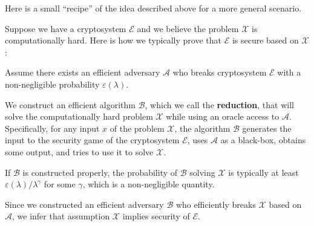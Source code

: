 \documentclass[../../book.tex]{subfiles}
\begin{document}
Here is a small ``recipe'' of the idea described above for a more general scenario.

\begin{proposition}
    Suppose we have a cryptosystem $\mathcal{E}$ and we believe the problem $\mathcal{X}$ is computationally hard.
    Here is how we typically prove that $\mathcal{E}$ is secure based on $\mathcal{X}$:
    \begin{algoen}
        \item Assume there exists an efficient adversary $\mathcal{A}$ who breaks cryptosystem $\mathcal{E}$ with a non-negligible probability $\varepsilon(\lambda)$.
        \item We construct an efficient algorithm $\mathcal{B}$, which we call the
        \textbf{reduction}, that will solve the computationally hard problem
        $\mathcal{X}$ while using an oracle access to $\mathcal{A}$. Specifically, for any
        input $x$ of the problem $\mathcal{X}$, the algorithm $\mathcal{B}$
        generates the input to the security game of the cryptosystem $\mathcal{E}$, uses $\mathcal{A}$ as a black-box, obtains some output, and tries to use it to solve $\mathcal{X}$.
        \item If $\mathcal{B}$ is constructed properly, the probability of $\mathcal{B}$ solving $\mathcal{X}$ is typically at least $\varepsilon(\lambda)/\lambda^{\gamma}$ for some $\gamma$, which is a non-negligible quantity.
        \item Since we constructed an efficient adversary $\mathcal{B}$ who efficiently breaks $\mathcal{X}$ based on $\mathcal{A}$, we infer that assumption $\mathcal{X}$ implies security of $\mathcal{E}$.
    \end{algoen}
\end{proposition}



\end{document}

